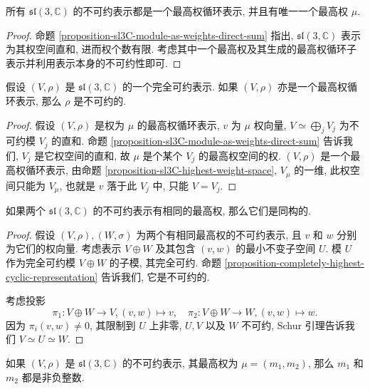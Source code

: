 \begin{proposition}
  所有 \( \mathfrak{sl}(3, \mathbb{C}) \) 的不可约表示都是一个最高权循环表示,
  并且有唯一一个最高权 \( \mu \).
\end{proposition}
\begin{proof}
  命题 \ref{proposition-sl3C-module-as-weights-direct-sum} 指出, \(
  \mathfrak{sl}(3, \mathbb{C}) \) 表示为其权空间直和, 进而权个数有限.
  考虑其中一个最高权及其生成的最高权循环子表示并利用表示本身的不可约性即可.
\end{proof}

\begin{proposition}
  \label{proposition-completely-highest-cyclic-representation}
  假设 \( (V, \rho) \) 是 \( \mathfrak{sl}(3, \mathbb{C}) \) 的一个完全可约表示.
  如果 \( (V, \rho) \) 亦是一个最高权循环表示, 那么 \( \rho \) 是不可约的.
\end{proposition}
\begin{proof}
  假设 \( (V, \rho) \) 是权为 \( \mu \) 的最高权循环表示, \( v \) 为 \( \mu \)
  权向量, \( V \simeq \bigoplus_j V_j \) 为不可约模 \( V_j \) 的直和. 命题
  \ref{proposition-sl3C-module-as-weights-direct-sum} 告诉我们, \( V_j \)
  是它权空间的直和, 故 \( \mu \) 是个某个 \( V_j \) 的最高权空间的权. \( (V,
  \rho) \) 是一个最高权循环表示, 由命题
  \ref{proposition-sl3C-highest-weight-space},  \( V_{\mu} \) 的一维,
  此权空间只能为 \( V_{\mu} \), 也就是 \( v \) 落于此 \( V_j \) 中, 只能 \( V =
  V_j \).
\end{proof}

\begin{proposition}
  如果两个 \( \mathfrak{sl}(3, \mathbb{C}) \) 的不可约表示有相同的最高权,
  那么它们是同构的.
\end{proposition}
\begin{proof}
  假设 \( (V, \rho), (W, \sigma) \) 为两个有相同最高权的不可约表示, 且 \( v \)
  和 \( w \) 分别为它们的权向量. 考虑表示 \( V \oplus W \) 及其包含 \( (v, w) \)
  的最小不变子空间 \( U \). 模 \( U \) 作为完全可约模 \( V \oplus W \) 的子模,
  其完全可约. 命题 \ref{proposition-completely-highest-cyclic-representation}
  告诉我们, 它是不可约的.

  考虑投影
  \[
    \pi_1: V \oplus W \to V, (v, w) \mapsto v,\quad \pi_2: V \oplus W
    \to W, (v, w) \mapsto w.
  \]
  因为 \( \pi_i(v, w) \neq 0 \), 其限制到 \( U \) 上非零, \( U, V \) 以及 \( W
  \) 不可约, Schur 引理告诉我们 \( V \simeq U \simeq W \).
\end{proof}

\begin{proposition}
  如果 \( (V, \rho) \) 是 \( \mathfrak{sl}(3, \mathbb{C}) \) 的不可约表示,
  其最高权为 \( \mu = (m_1, m_2) \), 那么 \( m_1 \) 和 \( m_2 \) 都是非负整数.
\end{proposition}

